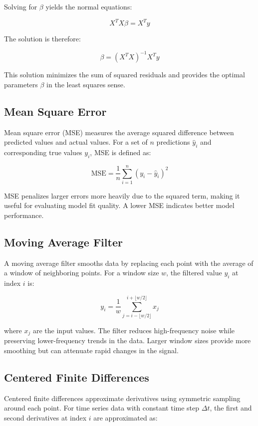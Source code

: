 Solving for \(\beta\) yields the normal equations:

\begin{equation}
\label{eq:normal_equations}
X^TX\beta = X^Ty
\end{equation}

The solution is therefore:

\begin{equation}
\label{eq:least_squares_solution}
\beta = (X^TX)^{-1}X^Ty
\end{equation}

This solution minimizes the sum of squared residuals and provides the optimal parameters \(\beta\) in the least squares sense.

\subsection{Mean Square Error}
Mean square error (MSE) measures the average squared difference between predicted values and actual values. For a set of \(n\) predictions \(\hat{y}_i\) and corresponding true values \(y_i\), MSE is defined as:

\begin{equation}
\label{eq:mse}
\text{MSE} = \frac{1}{n}\sum_{i=1}^n (y_i - \hat{y}_i)^2
\end{equation}

MSE penalizes larger errors more heavily due to the squared term, making it useful for evaluating model fit quality. A lower MSE indicates better model performance.


\subsection{Moving Average Filter}
A moving average filter smooths data by replacing each point with the average of a window of neighboring points. For a window size \(w\), the filtered value \(y_i\) at index \(i\) is:

\begin{equation}
\label{eq:moving_average}
y_i = \frac{1}{w}\sum_{j=i-\lfloor w/2 \rfloor}^{i+\lfloor w/2 \rfloor} x_j
\end{equation}

where \(x_j\) are the input values. The filter reduces high-frequency noise while preserving lower-frequency trends in the data. Larger window sizes provide more smoothing but can attenuate rapid changes in the signal.

\subsection{Centered Finite Differences}
Centered finite differences approximate derivatives using symmetric sampling around each point. For time series data with constant time step \(\Delta t\), the first and second derivatives at index \(i\) are approximated as:

